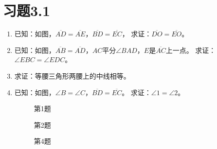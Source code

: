 \section*{习题3.1}
\begin{enumerate}
    \item 已知：如图，$\overline{AD}=\overline{AE}$，$\overline{BD}=\overline{EC}$，
    求证：$\overline{DO}=\overline{EO}$。
    \item 已知：如图，$\overline{AB}=\overline{AD}$，$AC$平分$\angle BAD$，$E$是$\overline{AC}$上一点。
    求证：$\angle EBC=\angle EDC$。
    \item 求证：等腰三角形两腰上的中线相等。
    \item 已知：如图，$\angle B=\angle C$，$\overline{BD}=\overline{EC}$。
    求证：$\angle 1=\angle 2$。

\begin{figure}
    \begin{minipage}[t]{0.31\linewidth}
    \centering
\begin{tikzpicture}[>=latex, scale=1]


    \end{tikzpicture}
    \caption*{第1题}
    \end{minipage}
    \begin{minipage}[t]{0.31\linewidth}
    \centering
    \begin{tikzpicture}[>=latex, scale=1]
    \end{tikzpicture}
    \caption*{第2题}
    \end{minipage}
        \begin{minipage}[t]{0.31\linewidth}
    \centering
    \begin{tikzpicture}[>=latex, scale=1]
    \end{tikzpicture}
    \caption*{第4题}
    \end{minipage}
    \end{figure}


\end{enumerate}
